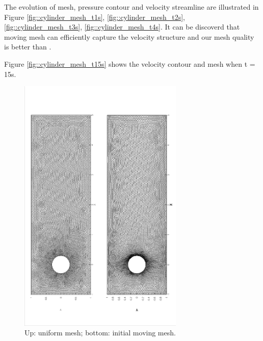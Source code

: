 \documentclass[a4paper, 11pt]{article}
\begin{document}
      The evolution of mesh, pressure contour and velocity streamline 
      are illustrated in Figure \ref{fig::cylinder_mesh_t1s},
      \ref{fig::cylinder_mesh_t2s}, \ref{fig::cylinder_mesh_t3s},
      \ref{fig::cylinder_mesh_t4s}. It can be discoverd that moving
      mesh can efficiently capture the velocity structure and our mesh
      quality is better than \cite{cao1999anr}.
      
      Figure \ref{fig::cylinder_mesh_t15s} shows the velocity contour
      and mesh when t = 15s. 

      \begin{figure}[!htbp]
        \centering
        \includegraphics[width = 0.7\textwidth, angle = -90]{picture/obstacle_flow_data/initial_mesh.eps}
        \caption{\small Up: uniform mesh; bottom: initial
          moving mesh.}
        \label{fig::cylinder_initial_mesh}
      \end{figure}
\end{document}
